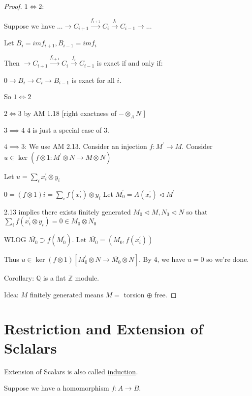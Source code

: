 \documentclass{article}
\theoremstyle{definition}
\begin{document}
\begin{proof}
    \(1 \iff 2\):

    Suppose we have \(\dots \to C_{i+1}\overset{f_{i+1} }{\to } C_i \overset{f_i}{\to } C_{i-1} \to \dots \)
    
    Let \(B_i = im f_{i+1}, B_{i-1}= im f_i \)  

    Then \(\to C_{i+1}\overset{f_{i+1} }{\to }C_i \overset{f_i}{\to } C_{i-1} \) is exact if and only if:
    
    \(0 \to B_i \to C_i \to B_{i-1}\) is exact for all \(i\).

    So \(1 \iff 2\) 

    \(2\iff 3\) by AM 1.18 [right exactness of \(- \otimes_A N\) ]

    \(3 \implies 4\) 4 is just a special case of 3.
    
    \(4 \implies 3\): We use AM 2.13. Consider an injection \(f:M^{\prime} \to M\). Consider \(u\in\ker(f \otimes 1: M^{\prime} \otimes N \to M \otimes N)\) 

    Let \(u = \sum_{i} x_i^{\prime} \otimes y_i\)
    
    \(0 = (f \otimes 1)i = \sum_{i} f(x_i^{\prime} )\otimes y_i\) Let \(M_0^{\prime} = A(x_i^{\prime} )\triangleleft M^{\prime} \) 

    2.13 implies there exists finitely generated \(M_0 \triangleleft M, N_0 \triangleleft N\) so that \(\sum_{i} f(x_i^{\prime} \otimes y_i)=0\in M_0 \otimes N_0\) 

    WLOG \(\overline{M_0} \supset f(M_0^{\prime} )\). Let \(\overline{M_0}=(M_0,f(x_i^{\prime} ))\)  

    Thus \(u\in\ker(f \otimes 1) [M_0^{\prime} \otimes N \to \overline{M_0} \otimes N]\). By 4, we have \(u = 0\) so we're done.

    Corollary: \(\mathbb{Q}\) is a flat \(\mathbb{Z}\) module.

    Idea: \(M\) finitely generated means \(M =\) torsion \(\oplus\) free.

\end{proof}

\section*{Restriction and Extension of Sclalars}

Extension of Scalars is also called \underline{induction}.

Suppose we have a homomorphism \(f: A \to B\).
\end{document}
